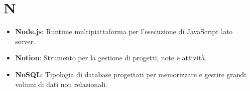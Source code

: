 \section{N}
\begin{itemize}
    \item \textbf{Node.js}: Runtime multipiattaforma per l'esecuzione di JavaScript lato server.
    \item \textbf{Notion}: Strumento per la gestione di progetti, note e attività.
    \item \textbf{NoSQL}: Tipologia di database progettati per memorizzare e gestire grandi volumi di dati non relazionali.
\end{itemize}
